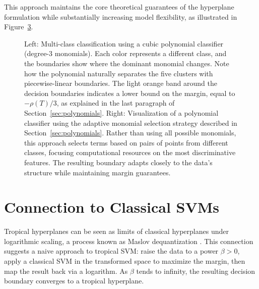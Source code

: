 \documentclass{article}
\begin{document}
This approach maintains the core theoretical guarantees of the hyperplane formulation while substantially increasing model flexibility, as illustrated in Figure~\ref{fig:poly_classifier_comparison}.

\vspace*{3em}
\begin{figure}[ht!]
    \centering
    \begin{subfigure}[t]{0.48\textwidth}
        \centering
        \resizebox{\textwidth}{!}{\clipbox{0.15\width{} 0.30\height{} 0.15\width{} 0.30\height{}}{}}
        \label{fig:homogeneous_selection}
    \end{subfigure}\hfill
    \begin{subfigure}[t]{0.48\textwidth}
        \centering
        \resizebox{\textwidth}{!}{\clipbox{0.15\width{} 0.30\height{} 0.15\width{} 0.30\height{}}{}}
        \label{fig:adaptive_polynomial}
    \end{subfigure}
    \caption{Left: Multi-class classification using a cubic polynomial classifier (degree-3 monomials). Each color represents a different class, and the boundaries show where the dominant monomial changes. Note how the polynomial naturally separates the five clusters with piecewise-linear boundaries. The light orange band around the decision boundaries indicates a lower bound on the margin, equal to $-\rho(T)/3$, as explained in the last paragraph of Section~\ref{sec:polynomials}. Right: Visualization of a polynomial classifier using the adaptive monomial selection strategy described in Section~\ref{sec:polynomials}. Rather than using all possible monomials, this approach selects terms based on pairs of points from different classes, focusing computational resources on the most discriminative features. The resulting boundary adapts closely to the data's structure while maintaining margin guarantees.}
    \label{fig:poly_classifier_comparison}
\end{figure}
\vspace*{3em}


\newpage
\section{Connection to Classical SVMs}\label{sec:maslov}
Tropical hyperplanes can be seen as limits of classical hyperplanes under logarithmic scaling, a process known as Maslov dequantization \cite{viro2001}. This connection suggests a naive approach to tropical SVM: raise the data to a power $\beta > 0$, apply a classical SVM in the transformed space to maximize the margin, then map the result back via a logarithm. As $\beta$ tends to infinity, the resulting decision boundary converges to a tropical hyperplane.
\end{document}
